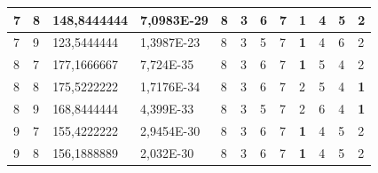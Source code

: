 \documentclass[conference]{IEEEtran}
\begin{document}
\begin{table}[]
\begin{tabular}{|llll|llllllll|}
		\multicolumn{1}{|l|}{7}   & \multicolumn{1}{l|}{8}         & \multicolumn{1}{l|}{148,8444444}   & 7,0983E-29 & \multicolumn{1}{l|}{8}   & \multicolumn{1}{l|}{3}   & \multicolumn{1}{l|}{6}   & \multicolumn{1}{l|}{7}   & \multicolumn{1}{l|}{\textbf{1}} & \multicolumn{1}{l|}{4}   & \multicolumn{1}{l|}{5}   & 2                      \\ \hline
		\multicolumn{1}{|l|}{7}   & \multicolumn{1}{l|}{9}         & \multicolumn{1}{l|}{123,5444444}   & 1,3987E-23 & \multicolumn{1}{l|}{8}   & \multicolumn{1}{l|}{3}   & \multicolumn{1}{l|}{5}   & \multicolumn{1}{l|}{7}   & \multicolumn{1}{l|}{\textbf{1}} & \multicolumn{1}{l|}{4}   & \multicolumn{1}{l|}{6}   & 2                      \\ \hline
		\multicolumn{1}{|l|}{8}   & \multicolumn{1}{l|}{7}         & \multicolumn{1}{l|}{177,1666667}   & 7,724E-35  & \multicolumn{1}{l|}{8}   & \multicolumn{1}{l|}{3}   & \multicolumn{1}{l|}{6}   & \multicolumn{1}{l|}{7}   & \multicolumn{1}{l|}{\textbf{1}} & \multicolumn{1}{l|}{5}   & \multicolumn{1}{l|}{4}   & 2                      \\ \hline
		\multicolumn{1}{|l|}{8}   & \multicolumn{1}{l|}{8}         & \multicolumn{1}{l|}{175,5222222}   & 1,7176E-34 & \multicolumn{1}{l|}{8}   & \multicolumn{1}{l|}{3}   & \multicolumn{1}{l|}{6}   & \multicolumn{1}{l|}{7}   & \multicolumn{1}{l|}{2}          & \multicolumn{1}{l|}{5}   & \multicolumn{1}{l|}{4}   & \textbf{1}             \\ \hline
		\multicolumn{1}{|l|}{8}   & \multicolumn{1}{l|}{9}         & \multicolumn{1}{l|}{168,8444444}   & 4,399E-33  & \multicolumn{1}{l|}{8}   & \multicolumn{1}{l|}{3}   & \multicolumn{1}{l|}{5}   & \multicolumn{1}{l|}{7}   & \multicolumn{1}{l|}{2}          & \multicolumn{1}{l|}{6}   & \multicolumn{1}{l|}{4}   & \textbf{1}             \\ \hline
		\multicolumn{1}{|l|}{9}   & \multicolumn{1}{l|}{7}         & \multicolumn{1}{l|}{155,4222222}   & 2,9454E-30 & \multicolumn{1}{l|}{8}   & \multicolumn{1}{l|}{3}   & \multicolumn{1}{l|}{6}   & \multicolumn{1}{l|}{7}   & \multicolumn{1}{l|}{\textbf{1}} & \multicolumn{1}{l|}{4}   & \multicolumn{1}{l|}{5}   & 2                      \\ \hline
		\multicolumn{1}{|l|}{9}   & \multicolumn{1}{l|}{8}         & \multicolumn{1}{l|}{156,1888889}   & 2,032E-30  & \multicolumn{1}{l|}{8}   & \multicolumn{1}{l|}{3}   & \multicolumn{1}{l|}{6}   & \multicolumn{1}{l|}{7}   & \multicolumn{1}{l|}{\textbf{1}} & \multicolumn{1}{l|}{4}   & \multicolumn{1}{l|}{5}   & 2                      \\ \hline

\end{tabular}
\end{table}
\end{document}
